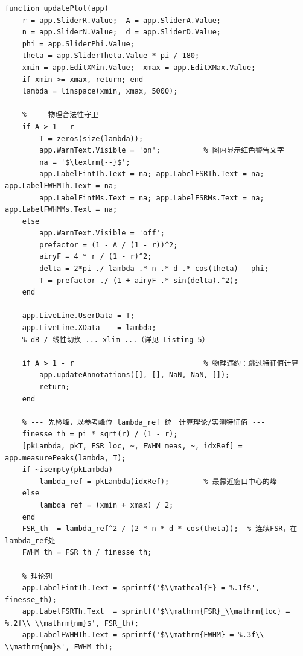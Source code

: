 \documentclass[10.5pt]{config}
\begin{document}
\begin{listing}[H]
\begin{verbatim}
function updatePlot(app)
    r = app.SliderR.Value;  A = app.SliderA.Value;
    n = app.SliderN.Value;  d = app.SliderD.Value;
    phi = app.SliderPhi.Value;
    theta = app.SliderTheta.Value * pi / 180;
    xmin = app.EditXMin.Value;  xmax = app.EditXMax.Value;
    if xmin >= xmax, return; end
    lambda = linspace(xmin, xmax, 5000);

    % --- 物理合法性守卫 ---
    if A > 1 - r
        T = zeros(size(lambda));
        app.WarnText.Visible = 'on';          % 图内显示红色警告文字
        na = '$\textrm{--}$';
        app.LabelFintTh.Text = na; app.LabelFSRTh.Text = na; app.LabelFWHMTh.Text = na;
        app.LabelFintMs.Text = na; app.LabelFSRMs.Text = na; app.LabelFWHMMs.Text = na;
    else
        app.WarnText.Visible = 'off';
        prefactor = (1 - A / (1 - r))^2;
        airyF = 4 * r / (1 - r)^2;
        delta = 2*pi ./ lambda .* n .* d .* cos(theta) - phi;
        T = prefactor ./ (1 + airyF .* sin(delta).^2);
    end

    app.LiveLine.UserData = T;
    app.LiveLine.XData    = lambda;
    % dB / 线性切换 ... xlim ...（详见 Listing 5）

    if A > 1 - r                              % 物理违约：跳过特征值计算
        app.updateAnnotations([], [], NaN, NaN, []);
        return;
    end

    % --- 先检峰，以参考峰位 lambda_ref 统一计算理论/实测特征值 ---
    finesse_th = pi * sqrt(r) / (1 - r);
    [pkLambda, pkT, FSR_loc, ~, FWHM_meas, ~, idxRef] = app.measurePeaks(lambda, T);
    if ~isempty(pkLambda)
        lambda_ref = pkLambda(idxRef);        % 最靠近窗口中心的峰
    else
        lambda_ref = (xmin + xmax) / 2;
    end
    FSR_th  = lambda_ref^2 / (2 * n * d * cos(theta));  % 连续FSR，在lambda_ref处
    FWHM_th = FSR_th / finesse_th;

    % 理论列
    app.LabelFintTh.Text = sprintf('$\\mathcal{F} = %.1f$', finesse_th);
    app.LabelFSRTh.Text  = sprintf('$\\mathrm{FSR}_\\mathrm{loc} = %.2f\\ \\mathrm{nm}$', FSR_th);
    app.LabelFWHMTh.Text = sprintf('$\\mathrm{FWHM} = %.3f\\ \\mathrm{nm}$', FWHM_th);


\end{verbatim}
\end{listing}
\end{document}
